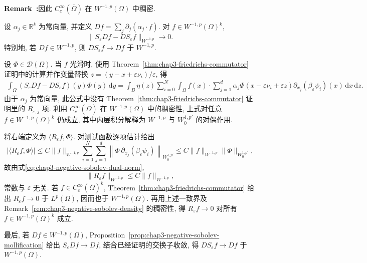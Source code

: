 \par\noindent{}\textbf{Remark~\thechapterthreesectiontworemark:}\label{rem:chap3-negative-sobolev-density}\quad 因此 $C_c^\infty(\overline\Omega)$ 在 $W^{-1,p}(\Omega)$ 中稠密.

\begin{Theorem}
\label{thm:chap3-negative-sobolev-commutator}
设 $\alpha_j\in\mathbb R^k$ 为常向量, 并定义 $Df=\sum_j\partial_j(\alpha_j\cdot f)$. 对 $f\in W^{-1,p}(\Omega)^k$,
\[
 \|S_\varepsilon Df-DS_\varepsilon f\|_{W^{-1,p}}\to0.
\]
特别地, 若 $Df\in W^{-1,p}$, 则 $DS_\varepsilon f\to Df$ 于 $W^{-1,p}$.
\end{Theorem}

\begin{Proof}
设 $\Phi\in\mathcal D(\Omega)$. 当 $f$ 光滑时, 使用 Theorem~\ref{thm:chap3-friedrichs-commutator} 证明中的计算并作变量替换 $z=(y-x+\varepsilon\nu_i)/\varepsilon$, 得
\begin{align*}
 \int_\Omega(S_\varepsilon Df-DS_\varepsilon f)(y)\Phi(y)\,\mathrm dy
 =\int_B\eta(z)\sum_{i=0}^N\int_\Omega f(x)\cdot
 \sum_{j=1}^d\alpha_j\Phi(x-\varepsilon\nu_i+\varepsilon z)
 \partial_{x_j}(\beta_\varepsilon\psi_i)(x)\,\mathrm dx\,\mathrm dz.
\end{align*}
由于 $\alpha_j$ 为常向量, 此公式中没有 Theorem~\ref{thm:chap3-friedrichs-commutator} 证明里的 $R_{\varepsilon,j}$ 项. 利用 $C_c^\infty(\overline\Omega)$ 在 $W^{-1,p}(\Omega)$ 中的稠密性, 上式对任意 $f\in W^{-1,p}(\Omega)^k$ 仍成立, 其中内层积分解释为 $W^{-1,p}$ 与 $W_0^{1,p'}$ 的对偶作用.

将右端定义为 $\langle R_\varepsilon f,\Phi\rangle$. 对测试函数逐项估计给出
\[
 |\langle R_\varepsilon f,\Phi\rangle|
 \leq C\|f\|_{W^{-1,p}}\sum_{i=0}^N\sum_{j=1}^d
 \left\|\Phi\,\partial_{x_j}(\beta_\varepsilon\psi_i)\right\|_{W_0^{1,p'}}
 \leq C\|f\|_{W^{-1,p}}\|\Phi\|_{W_0^{1,p'}},
\]
故由式\eqref{eq:chap3-negative-sobolev-dual-norm},
\[
 \|R_\varepsilon f\|_{W^{-1,p}}\leq C\|f\|_{W^{-1,p}},
\]
常数与 $\varepsilon$ 无关. 若 $f\in C_c^\infty(\overline\Omega)^k$, Theorem~\ref{thm:chap3-friedrichs-commutator} 给出 $R_\varepsilon f\to0$ 于 $L^p(\Omega)$, 因而也于 $W^{-1,p}(\Omega)$. 再用上述一致界及 Remark~\ref{rem:chap3-negative-sobolev-density} 的稠密性, 得 $R_\varepsilon f\to0$ 对所有 $f\in W^{-1,p}(\Omega)^k$ 成立.

最后, 若 $Df\in W^{-1,p}(\Omega)$, Proposition~\ref{prop:chap3-negative-sobolev-mollification} 给出 $S_\varepsilon Df\to Df$, 结合已经证明的交换子收敛, 得 $DS_\varepsilon f\to Df$ 于 $W^{-1,p}(\Omega)$.
\end{Proof}

